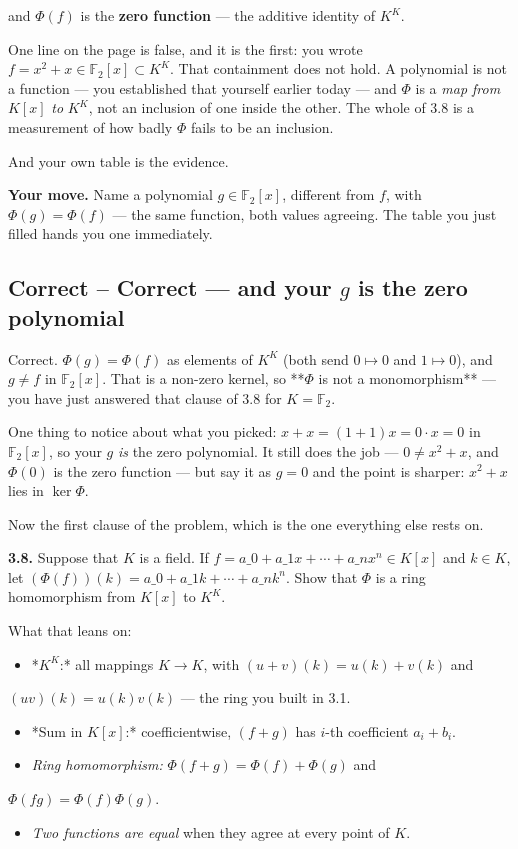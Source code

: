 \documentclass[11pt]{article}
\begin{document}
and $\Phi(f)$ is the \textbf{zero function} --- the additive identity of $K^K$.

One line on the page is false, and it is the first: you wrote $f = x^2 + x \in \mathbb{F}_2[x] \subset K^K$. That containment does not hold. A polynomial is not a function --- you established that yourself earlier today --- and $\Phi$ is a \emph{map from} $K[x]$ \emph{to} $K^K$, not an inclusion of one inside the other. The whole of 3.8 is a measurement of how badly $\Phi$ fails to be an inclusion.

And your own table is the evidence.

\textbf{Your move.} Name a polynomial $g \in \mathbb{F}_2[x]$, different from $f$, with $\Phi(g) = \Phi(f)$ --- the same function, both values agreeing. The table you just filled hands you one immediately.


\subsection*{Correct -- Correct --- and your $g$ is the zero polynomial}
Correct. $\Phi(g) = \Phi(f)$ as elements of $K^K$ (both send $0 \mapsto 0$ and
$1 \mapsto 0$), and $g \neq f$ in $\mathbb{F}_2[x]$. That is a non-zero kernel,
so **$\Phi$ is not a monomorphism** --- you have just answered that clause of 3.8
for $K = \mathbb{F}_2$.

One thing to notice about what you picked: $x + x = (1+1)x = 0 \cdot x = 0$ in
$\mathbb{F}_2[x]$, so your $g$ \emph{is} the zero polynomial. It still does the job ---
$0 \neq x^2 + x$, and $\Phi(0)$ is the zero function --- but say it as $g = 0$ and
the point is sharper: $x^2 + x$ lies in $\ker \Phi$.

Now the first clause of the problem, which is the one everything else rests on.

\textbf{3.8.} Suppose that $K$ is a field. If $f = a\_0 + a\_1x + \cdots + a\_nx^n \in
K[x]$ and $k \in K$, let $(\Phi(f))(k) = a\_0 + a\_1k + \cdots + a\_nk^n$. Show
that $\Phi$ is a ring homomorphism from $K[x]$ to $K^K$.

What that leans on:

\begin{itemize}
  \item *$K^K$:* all mappings $K \to K$, with $(u+v)(k) = u(k)+v(k)$ and
\end{itemize}
  $(uv)(k) = u(k)v(k)$ --- the ring you built in 3.1.
\begin{itemize}
  \item *Sum in $K[x]$:* coefficientwise, $(f+g)$ has $i$-th coefficient $a_i + b_i$.
  \item \emph{Ring homomorphism:} $\Phi(f+g) = \Phi(f) + \Phi(g)$ and
\end{itemize}
  $\Phi(fg) = \Phi(f)\Phi(g)$.
\begin{itemize}
  \item \emph{Two functions are equal} when they agree at every point of $K$.
\end{itemize}
\end{document}

